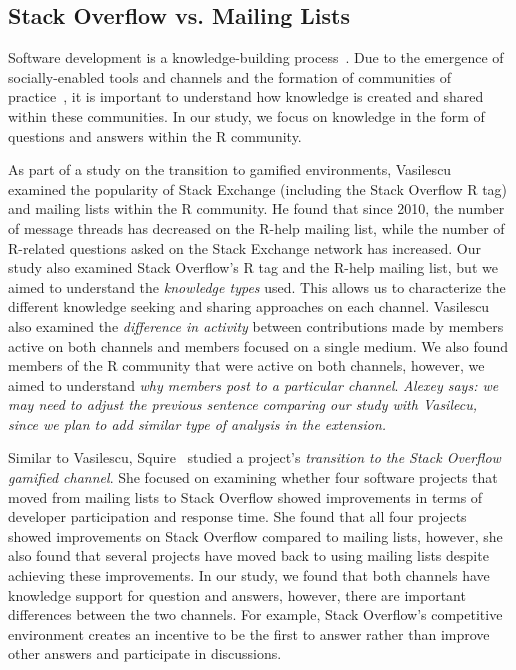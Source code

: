 \documentclass[smallextended]{svjour3}       %
\newcommand{\alexey}[1]{{\color{cyan}\emph{Alexey says: #1}}\xspace}
\newcommand{\alexey}[1]{}
\newcommand{\SO}{Stack Overflow\xspace}
\newcommand{\RH}{R-help\xspace}
\begin{document}
\subsection{\SO vs. Mailing Lists}
Software development is a knowledge-building process~\cite{naur1985programming}. Due to the emergence of socially-enabled tools and channels and the formation of communities of practice~\cite{Storey2014}, it is important to understand how knowledge is created and shared within these communities. In our study, we focus on knowledge in the form of questions and answers within the R community.


As part of a study on the transition to gamified environments, Vasilescu~\cite{Vasi1escu2014PhD} examined the popularity of Stack Exchange (including the \SO R tag) and
mailing lists within the R community. He found that since 2010, the number of message threads has decreased on the \RH mailing list, while the number of
R-related questions asked on the Stack Exchange network has increased. Our study also examined \SO's R tag and the \RH mailing list, but we aimed to understand the \textit{knowledge types} used. This allows us to characterize the different knowledge seeking and sharing approaches on each channel. Vasilescu also examined the \textit{difference in activity} between contributions made by members active on both channels and members focused on a single medium. We also found members of the R community that were active on both channels, however, we aimed to understand \textit{why members post to a particular channel}.
\alexey{we may need to adjust the previous sentence comparing our study with Vasilecu, since we plan to add similar type of analysis in the extension.}

Similar to Vasilescu, Squire~\cite{Squire2015a} studied a project's \textit{transition to the \SO gamified channel}. She focused on examining whether four software projects that moved from mailing lists to \SO showed improvements in terms of developer participation and response time. She found that all four projects showed improvements on \SO compared to mailing lists, however, she also found that several projects have moved back to using mailing lists despite achieving these improvements. In our study, we found that both channels have knowledge support for question and answers, however, there are important differences between the two channels. For example, \SO's competitive environment creates an incentive to be the first to answer rather than improve other answers and participate in discussions.
\end{document}
